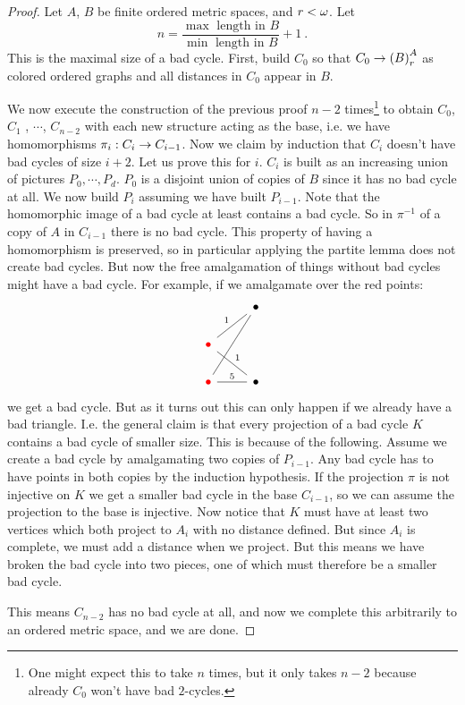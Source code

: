 \documentclass{amsart}
\begin{document}
\begin{proof}
Let $A$, $B$ be finite ordered metric spaces, and $r < \omega$. Let
\begin{equation}
n = \frac{\max \text{ length in } B}{\min \text{ length in } B} + 1 \ .
\end{equation}
This is the maximal size of a bad cycle. First, build $C_0$ so that $C_0\rightarrow
\left( B \right)^A_r$ as colored ordered graphs and all distances in $C_0$ appear in $B$.

We now execute the construction of the previous proof $n-2$ times\footnote{One might
expect this to take $n$ times, but it only takes $n-2$ because already $C_0$ won't have
bad $2$-cycles.} to obtain $C_0$, $C_1$ ,
$\cdots$, $C_{n-2}$ with each new structure acting as the base, i.e. we have homomorphisms
$\pi_i: C_i \rightarrow C_{i-1}$. Now we claim by induction that $C_i$ doesn't have bad cycles
of size $i+2$.
Let us prove this for $i$. $C_i$ is built as an increasing union of pictures $P_0 , \cdots
, P_d$. $P_0$ is a disjoint union of copies of $B$ since it has no bad cycle at all.
We now build $P_i$ assuming we have built $P_{i-1}$. 
Note that the homomorphic image of a bad cycle at least contains a bad
cycle. So in $\pi^{-1}$ of a copy of $A$ in $C_{i-1}$ there is no bad cycle.
This property of having a homomorphism is preserved, so in particular applying the partite lemma
does not create bad cycles. 
But now the free amalgamation of things without bad cycles
might have a bad cycle. For example, if we amalgamate over the red points:
\begin{equation}
\begin{tikzcd}
&
\point
\arrow[dash]{ddl}
\\
\textcolor{red}{\point}
\arrow[dash]{ur}{1}\arrow[dash]{dr}{1}&\\
\textcolor{red}{\point}
\arrow[dash]{r}{5}&
\point
\end{tikzcd}
\end{equation}
we get a bad cycle. But as it turns out this can only happen if we already have a bad
triangle. I.e. the general
claim is that every projection of a bad cycle $K$ contains a bad cycle of smaller size.
This is because of the following. Assume we create a bad cycle by amalgamating two copies
of $P_{i-1}$. Any bad cycle has to have points in both copies by the induction hypothesis.
If the projection $\pi$ is not injective on $K$ we get a smaller bad cycle in the base
$C_{i-1}$, so we can assume the projection to the base is injective.
Now notice that $K$ must have at least two vertices which both project to $A_i$ with no
distance defined. But since $A_i$ is complete, we must add a distance when we project.
But this means we have broken the bad cycle into two pieces, one of which must therefore
be a smaller bad cycle.

This means $C_{n-2}$ has no bad cycle at all, and now we complete this arbitrarily to an
ordered metric space, and we are done.
\end{proof}
\end{document}
